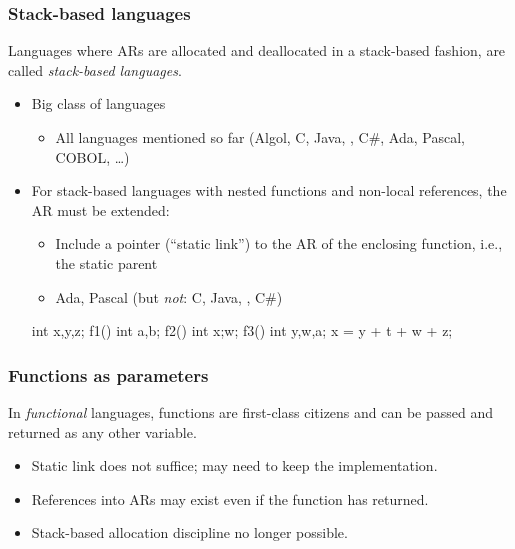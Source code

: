 \documentclass{beamer}
\begin{document}
\begin{frame}[fragile]
\frametitle{Stack-based languages}
Languages where ARs are allocated and deallocated in a
stack-based fashion, are called \textit{stack-based languages}. 

\begin{itemize}
\item Big class of languages
\begin{itemize}
\item  All languages mentioned so far 
(Algol, C, Java, \Cpp, C\#, Ada, Pascal, COBOL, \ldots)
\end{itemize}
\item For stack-based languages with nested functions and non-local references,
the AR must be extended:
\begin{itemize}
\item  Include a pointer  (``static link'') to the AR of the enclosing function,
i.e., the static parent 
\item Ada, Pascal (but \textit{not}: C, Java, \Cpp, C\#)
\end{itemize}

\begin{cplus3}
int x,y,z;
f1() {
   int a,b;
   f2() {
       int x;w;
       f3() {
          int y,w,a;
       }
       x = y + t + w + z; }}
\end{cplus3}
\end{itemize}

\end{frame}

\begin{frame}[fragile]
\frametitle{Functions as parameters}
In \textit{functional} languages, functions are first-class
citizens and can be passed and returned as any other variable.

\begin{itemize}
\item Static link does not suffice; may need to keep the implementation.
\item References into ARs may exist even if the function
has returned.
\item Stack-based allocation discipline no longer possible.

\end{itemize}

\end{frame}
\end{document}
